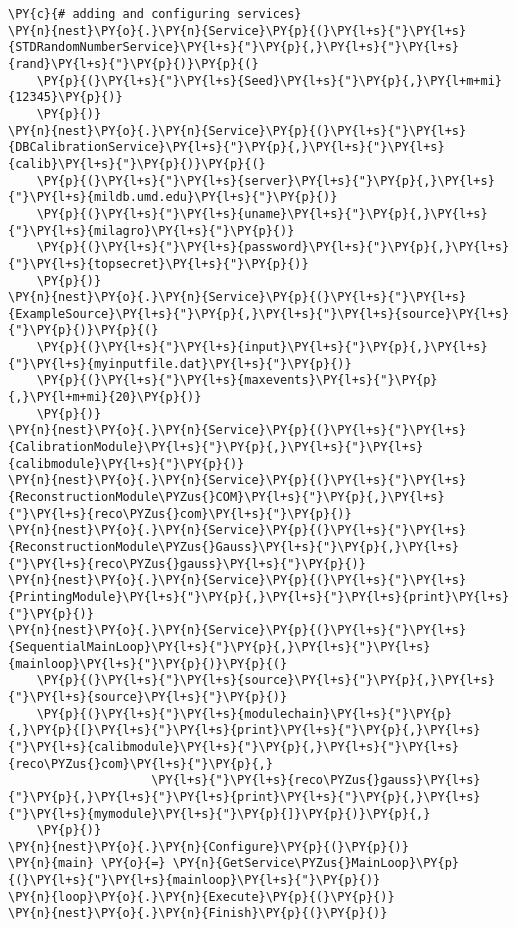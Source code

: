 \begin{Verbatim}[commandchars=\\\{\}]
\PY{c}{# adding and configuring services}
\PY{n}{nest}\PY{o}{.}\PY{n}{Service}\PY{p}{(}\PY{l+s}{"}\PY{l+s}{STDRandomNumberService}\PY{l+s}{"}\PY{p}{,}\PY{l+s}{"}\PY{l+s}{rand}\PY{l+s}{"}\PY{p}{)}\PY{p}{(}
    \PY{p}{(}\PY{l+s}{"}\PY{l+s}{Seed}\PY{l+s}{"}\PY{p}{,}\PY{l+m+mi}{12345}\PY{p}{)}
    \PY{p}{)}
\PY{n}{nest}\PY{o}{.}\PY{n}{Service}\PY{p}{(}\PY{l+s}{"}\PY{l+s}{DBCalibrationService}\PY{l+s}{"}\PY{p}{,}\PY{l+s}{"}\PY{l+s}{calib}\PY{l+s}{"}\PY{p}{)}\PY{p}{(}
    \PY{p}{(}\PY{l+s}{"}\PY{l+s}{server}\PY{l+s}{"}\PY{p}{,}\PY{l+s}{"}\PY{l+s}{mildb.umd.edu}\PY{l+s}{"}\PY{p}{)}
    \PY{p}{(}\PY{l+s}{"}\PY{l+s}{uname}\PY{l+s}{"}\PY{p}{,}\PY{l+s}{"}\PY{l+s}{milagro}\PY{l+s}{"}\PY{p}{)}
    \PY{p}{(}\PY{l+s}{"}\PY{l+s}{password}\PY{l+s}{"}\PY{p}{,}\PY{l+s}{"}\PY{l+s}{topsecret}\PY{l+s}{"}\PY{p}{)}
    \PY{p}{)}
\PY{n}{nest}\PY{o}{.}\PY{n}{Service}\PY{p}{(}\PY{l+s}{"}\PY{l+s}{ExampleSource}\PY{l+s}{"}\PY{p}{,}\PY{l+s}{"}\PY{l+s}{source}\PY{l+s}{"}\PY{p}{)}\PY{p}{(}
    \PY{p}{(}\PY{l+s}{"}\PY{l+s}{input}\PY{l+s}{"}\PY{p}{,}\PY{l+s}{"}\PY{l+s}{myinputfile.dat}\PY{l+s}{"}\PY{p}{)}
    \PY{p}{(}\PY{l+s}{"}\PY{l+s}{maxevents}\PY{l+s}{"}\PY{p}{,}\PY{l+m+mi}{20}\PY{p}{)}
    \PY{p}{)}
\PY{n}{nest}\PY{o}{.}\PY{n}{Service}\PY{p}{(}\PY{l+s}{"}\PY{l+s}{CalibrationModule}\PY{l+s}{"}\PY{p}{,}\PY{l+s}{"}\PY{l+s}{calibmodule}\PY{l+s}{"}\PY{p}{)}
\PY{n}{nest}\PY{o}{.}\PY{n}{Service}\PY{p}{(}\PY{l+s}{"}\PY{l+s}{ReconstructionModule\PYZus{}COM}\PY{l+s}{"}\PY{p}{,}\PY{l+s}{"}\PY{l+s}{reco\PYZus{}com}\PY{l+s}{"}\PY{p}{)}
\PY{n}{nest}\PY{o}{.}\PY{n}{Service}\PY{p}{(}\PY{l+s}{"}\PY{l+s}{ReconstructionModule\PYZus{}Gauss}\PY{l+s}{"}\PY{p}{,}\PY{l+s}{"}\PY{l+s}{reco\PYZus{}gauss}\PY{l+s}{"}\PY{p}{)}
\PY{n}{nest}\PY{o}{.}\PY{n}{Service}\PY{p}{(}\PY{l+s}{"}\PY{l+s}{PrintingModule}\PY{l+s}{"}\PY{p}{,}\PY{l+s}{"}\PY{l+s}{print}\PY{l+s}{"}\PY{p}{)}
\PY{n}{nest}\PY{o}{.}\PY{n}{Service}\PY{p}{(}\PY{l+s}{"}\PY{l+s}{SequentialMainLoop}\PY{l+s}{"}\PY{p}{,}\PY{l+s}{"}\PY{l+s}{mainloop}\PY{l+s}{"}\PY{p}{)}\PY{p}{(}
    \PY{p}{(}\PY{l+s}{"}\PY{l+s}{source}\PY{l+s}{"}\PY{p}{,}\PY{l+s}{"}\PY{l+s}{source}\PY{l+s}{"}\PY{p}{)}
    \PY{p}{(}\PY{l+s}{"}\PY{l+s}{modulechain}\PY{l+s}{"}\PY{p}{,}\PY{p}{[}\PY{l+s}{"}\PY{l+s}{print}\PY{l+s}{"}\PY{p}{,}\PY{l+s}{"}\PY{l+s}{calibmodule}\PY{l+s}{"}\PY{p}{,}\PY{l+s}{"}\PY{l+s}{reco\PYZus{}com}\PY{l+s}{"}\PY{p}{,}
                    \PY{l+s}{"}\PY{l+s}{reco\PYZus{}gauss}\PY{l+s}{"}\PY{p}{,}\PY{l+s}{"}\PY{l+s}{print}\PY{l+s}{"}\PY{p}{,}\PY{l+s}{"}\PY{l+s}{mymodule}\PY{l+s}{"}\PY{p}{]}\PY{p}{)}\PY{p}{,}
    \PY{p}{)}
\PY{n}{nest}\PY{o}{.}\PY{n}{Configure}\PY{p}{(}\PY{p}{)}
\PY{n}{main} \PY{o}{=} \PY{n}{GetService\PYZus{}MainLoop}\PY{p}{(}\PY{l+s}{"}\PY{l+s}{mainloop}\PY{l+s}{"}\PY{p}{)}
\PY{n}{loop}\PY{o}{.}\PY{n}{Execute}\PY{p}{(}\PY{p}{)}
\PY{n}{nest}\PY{o}{.}\PY{n}{Finish}\PY{p}{(}\PY{p}{)}
\end{Verbatim}

